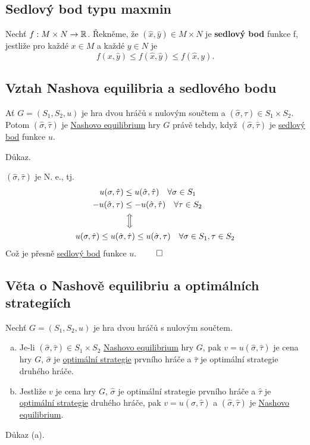 \subsection{Sedlový bod typu maxmin}\label{sedlmax}
Nechť $f: M \times N \rightarrow \mathbb{R}$. Řekněme, že $(\hat x, \hat y) \in M \times N$ je \textbf{sedlový bod} funkce f, 
jestliže pro každé $x \in M$ a každé $y \in N$ je 
\[ 
    f(x, \hat y) \leq f(\hat x, \hat y) \leq f(\hat x, y).
\]
\newpage
\subsection{Vztah Nashova equilibria a sedlového bodu}\label{sedl}
Ať $G = (S_1, S_2, u)$ je hra dvou hráčů s nulovým součtem a $(\hat \sigma, \hat \tau) \in S_1 \times S_2$. Potom 
$(\hat \sigma, \hat \tau)$ je \hyperref[nash]{Nashovo equilibrium} hry $G$ právě tehdy, když $(\hat \sigma, \hat \tau)$
je \hyperref[sedlmax]{sedlový bod} funkce $u$.

Důkaz.

$(\hat \sigma, \hat \tau)$ je N. e., tj. 
\begin{align*}
    u(\sigma, \hat \tau) &\leq u(\hat \sigma, \hat \tau) \quad \forall \sigma \in S_1 \\
    -u(\hat \sigma, \tau) &\leq -u(\hat \sigma, \hat \tau) \quad \forall \tau \in S_2 \\
    &\,\, \Big\Updownarrow \\
    u(\sigma, \hat \tau) \leq u (\hat \sigma&, \hat \tau) \leq u(\hat \sigma, \tau) \quad \forall \sigma \in S_1, 
    \tau \in S_2
\end{align*}
Což je přesně \hyperref[sedlmax]{sedlový bod} funkce $u$. $\qed$

\subsection{Věta o Nashově equilibriu a optimálních strategiích}\label{nashOpt}
Nechť $G = (S_1, S_2, u)$ je hra dvou hráčů s nulovým součtem.
\begin{enumerate}[(a)]
    \item Je-li $(\hat \sigma, \hat \tau) \in S_1 \times S_2$ \hyperref[nash]{Nashovo equilibrium} hry $G$, pak 
    $v = u(\hat \sigma, \hat \tau)$ je cena hry $G$, $\hat \sigma$ je \hyperref[optimalStrat]{optimální strategie} 
    prvního hráče a $\hat \tau$ je optimální strategie druhého hráče.
    \item Jestliže $v$ je cena hry $G$, $\hat \sigma$ je optimální strategie prvního hráče a $\hat \tau$ je 
    \hyperref[optimalStrat]{optimální strategie} druhého hráče, pak 
    $v = u(\hat \sigma, \hat \tau)$ a $(\hat \sigma, \hat \tau)$ je \hyperref[nash]{Nashovo equilibrium}.
\end{enumerate}
Důkaz (a).

